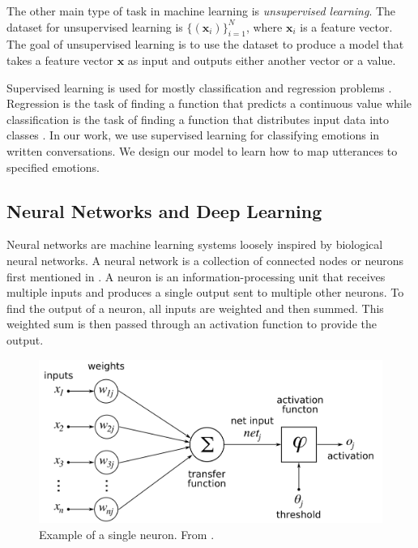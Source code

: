 \documentclass[nofilelist]{cslthse-msc}
\begin{document}
The other main type of task in machine learning is \textit{unsupervised learning}. The dataset for unsupervised learning is $\{ (\mathbf{x}_i)\}_{i=1}^N$, where $\mathbf{x}_i$ is a feature vector. The goal of unsupervised learning is to use the dataset to produce a model that takes a feature vector $\mathbf{x}$ as input and outputs either another vector or a value. 

Supervised learning is used for mostly classification and regression problems \citep{franoischollet2017learning}. Regression is the task of finding a function that predicts a continuous value while classification is the task of finding a function that distributes input data into classes \citep{alpaydin2014introduction}. In our work, we use supervised learning for classifying emotions in written conversations. We design our model to learn how to map utterances to specified emotions. 




\subsection{Neural Networks and Deep Learning}


Neural networks are machine learning systems loosely inspired by biological neural networks. A neural network is a collection of connected nodes or neurons first mentioned in \citet{mcculloch1943}. A neuron \citep{dawson1998ann} is an information-processing unit that receives multiple inputs and produces a single output sent to multiple other neurons. To find the output of a neuron, all inputs are weighted and then summed. This weighted sum is then passed through an activation function to provide the output.




\begin{figure}[htp]
    \centering
    \includegraphics[width=12cm]{msccls/explanatory_images/neuron_new.png}
    \caption{Example of a single neuron. From \citet{wiki:neuron_image}.}
    \label{fig:neuron}
\end{figure}
\end{document}
